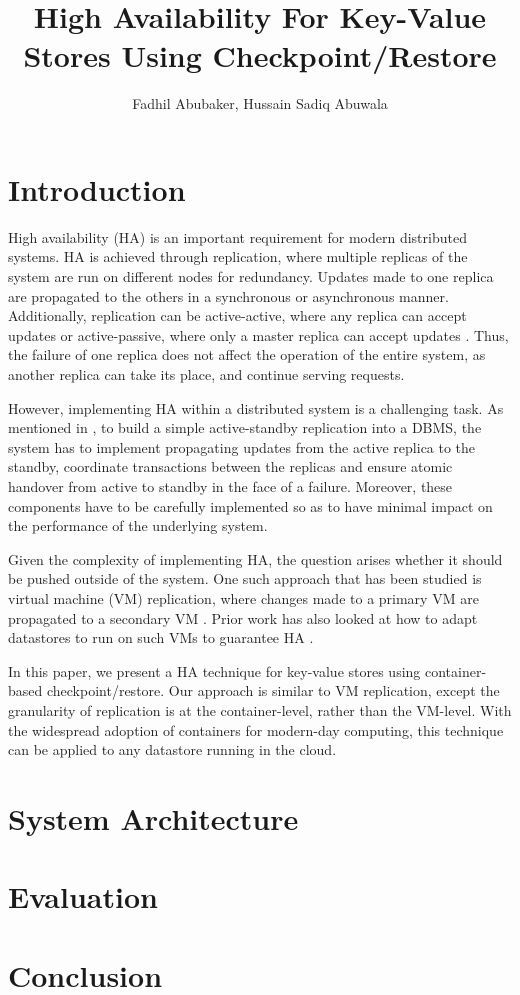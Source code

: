 \documentclass[draft]{proc}
\title{High Availability For Key-Value Stores Using Checkpoint/Restore}
\author{Fadhil Abubaker, Hussain Sadiq Abuwala}
\date{}
\begin{document}
\maketitle

\section{Introduction}

High availability (HA) is an important requirement for modern distributed
systems. HA is achieved through replication, where multiple replicas of the
system are run on different nodes for redundancy. Updates made to one replica
are propagated to the others in a synchronous or asynchronous manner.
Additionally, replication can be active-active, where any replica can accept
updates or active-passive, where only a master replica can accept updates
\cite{Dangers}. Thus, the failure of one replica does not affect the operation
of the entire system, as another replica can take its place, and continue
serving requests.

However, implementing HA within a distributed system is a challenging task. As
mentioned in \cite{RemusDB}, to build a simple active-standby replication into a
DBMS, the system has to implement propagating updates from the active replica to
the standby, coordinate transactions between the replicas and ensure atomic
handover from active to standby in the face of a failure. Moreover, these
components have to be carefully implemented so as to have minimal impact on the
performance of the underlying system.

Given the complexity of implementing HA, the question arises whether it should
be pushed outside of the system. One such approach that has been studied is
virtual machine (VM) replication, where changes made to a primary VM are
propagated to a secondary VM \cite{Hypervisor, Remus, Scales2010TheDA}. Prior
work has also looked at how to adapt datastores to run on such VMs to guarantee
HA \cite{RemusDB}.

In this paper, we present a HA technique for key-value stores using
container-based checkpoint/restore. Our approach is similar to VM replication,
except the granularity of replication is at the container-level, rather than the
VM-level. With the widespread adoption of containers for modern-day computing,
this technique can be applied to any datastore running in the cloud.

\section{System Architecture}

\section{Evaluation}

\section{Conclusion}

\printbibliography
\end{document}
